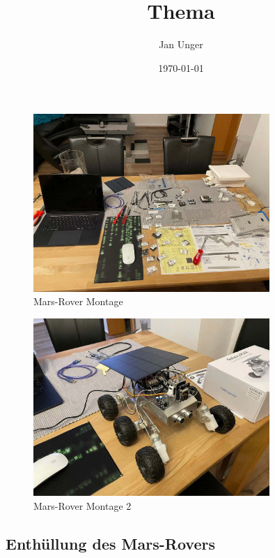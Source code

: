 \documentclass{vorlage-design-main}
\title{Thema}
\author{Jan Unger}
\date{\today}
\begin{document}
\maketitle

\begin{abstract}

\end{abstract}

\begin{figure}
\centering
\includegraphics[width=0.8\textwidth]{images/rover-bau.pdf}
\floatnotes{}
\caption{Mars-Rover Montage}
\end{figure}

\begin{figure}
\centering
\includegraphics[width=0.8\textwidth]{images/rover-bau2.pdf}
\floatnotes{}
\caption{Mars-Rover Montage 2}
\end{figure}

\hypertarget{enthuxfcllung-des-mars-rovers}{%
\subsection{Enthüllung des
Mars-Rovers}\label{enthuellung-des-mars-rovers}}
\end{document}
